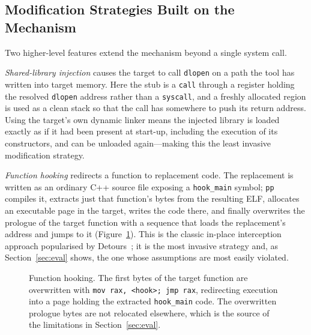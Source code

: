 \documentclass[10pt,twocolumn,a4paper]{article}
\newcommand{\dstyles}{%
  \tikzset{%
    pstep/.style={draw, rounded corners, fill=black!4, align=left,
      inner sep=5pt, font=\footnotesize, text width=6.2cm},
    flow/.style={->, >=latex, thick},
    memblock/.style={draw, align=left, inner sep=5pt,
      font=\footnotesize\ttfamily, fill=black!3},
  }%
}
\begin{document}
\subsection{Modification Strategies Built on the Mechanism}
Two higher-level features extend the mechanism beyond a single system call.

\emph{Shared-library injection} causes the target to call \texttt{dlopen} on a
path the tool has written into target memory. Here the stub is a \texttt{call}
through a register holding the resolved \texttt{dlopen} address rather than a
\texttt{syscall}, and a freshly allocated region is used as a clean stack so that
the call has somewhere to push its return address. Using the target's own
dynamic linker means the injected library is loaded exactly as if it had been
present at start-up, including the execution of its constructors, and can be
unloaded again---making this the least invasive modification strategy.

\emph{Function hooking} redirects a function to replacement code. The replacement
is written as an ordinary C++ source file exposing a \texttt{hook\_main} symbol;
\texttt{pp} compiles it, extracts just that function's bytes from the resulting
ELF, allocates an executable page in the target, writes the code there, and
finally overwrites the prologue of the target function with a sequence that loads
the replacement's address and jumps to it (Figure~\ref{fig:hook}). This is the
classic in-place interception approach popularised by Detours~\cite{detours}; it
is the most invasive strategy and, as Section~\ref{sec:eval} shows, the one whose
assumptions are most easily violated.

\begin{figure}[t]
\centering
{}
\caption{Function hooking. The first bytes of the target function are overwritten
with \texttt{mov rax, <hook>; jmp rax}, redirecting execution into a page holding
the extracted \texttt{hook\_main} code. The overwritten prologue bytes are not
relocated elsewhere, which is the source of the limitations in
Section~\ref{sec:eval}.}
\label{fig:hook}
\end{figure}
\end{document}

